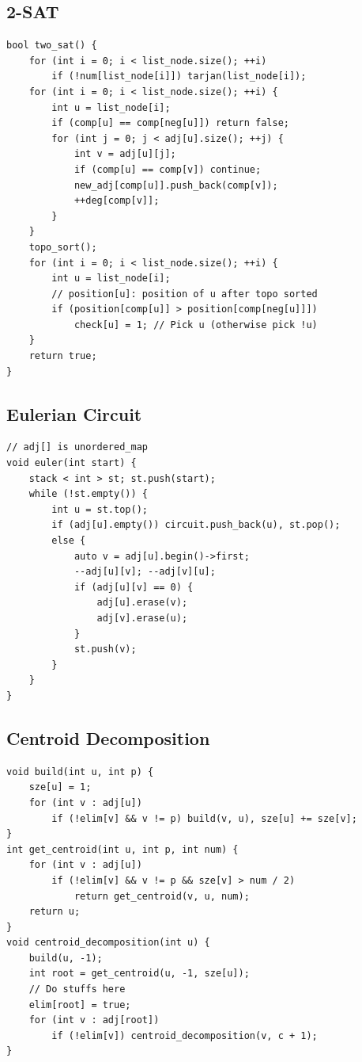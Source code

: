 \documentclass[10pt,letterpaper,landscape]{article}
\begin{document}
\begin{multicols}{2}
\subsection{2-SAT}
\begin{lstlisting}
bool two_sat() {
    for (int i = 0; i < list_node.size(); ++i)
        if (!num[list_node[i]]) tarjan(list_node[i]);
    for (int i = 0; i < list_node.size(); ++i) {
        int u = list_node[i];
        if (comp[u] == comp[neg[u]]) return false;
        for (int j = 0; j < adj[u].size(); ++j) {
            int v = adj[u][j];
            if (comp[u] == comp[v]) continue;
            new_adj[comp[u]].push_back(comp[v]);
            ++deg[comp[v]];
        }
    }
    topo_sort();
    for (int i = 0; i < list_node.size(); ++i) {
        int u = list_node[i];
        // position[u]: position of u after topo sorted
        if (position[comp[u]] > position[comp[neg[u]]])
            check[u] = 1; // Pick u (otherwise pick !u)
    }
    return true;
}
\end{lstlisting}
\subsection{Eulerian Circuit}
\begin{lstlisting}
// adj[] is unordered_map
void euler(int start) {
    stack < int > st; st.push(start);
    while (!st.empty()) {
        int u = st.top();
        if (adj[u].empty()) circuit.push_back(u), st.pop();
        else {
            auto v = adj[u].begin()->first;
            --adj[u][v]; --adj[v][u];
            if (adj[u][v] == 0) {
                adj[u].erase(v);
                adj[v].erase(u);
            }
            st.push(v);
        }
    }
}
\end{lstlisting}
\subsection{Centroid Decomposition}
\begin{lstlisting}
void build(int u, int p) {
    sze[u] = 1;
    for (int v : adj[u])
        if (!elim[v] && v != p) build(v, u), sze[u] += sze[v];
}
int get_centroid(int u, int p, int num) {
    for (int v : adj[u])
        if (!elim[v] && v != p && sze[v] > num / 2)
            return get_centroid(v, u, num);
    return u;
}
void centroid_decomposition(int u) {
    build(u, -1);
    int root = get_centroid(u, -1, sze[u]);
    // Do stuffs here
    elim[root] = true;
    for (int v : adj[root])
        if (!elim[v]) centroid_decomposition(v, c + 1);
}
\end{lstlisting}

\end{multicols}
\end{document}
